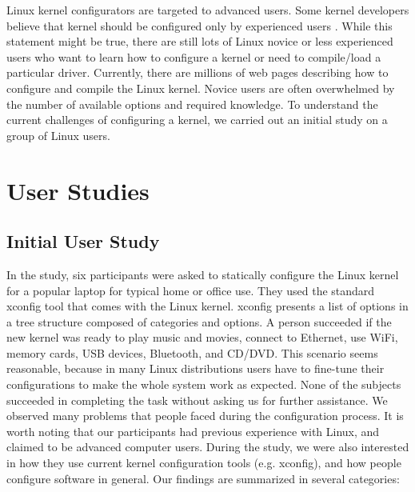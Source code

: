 \documentclass{chi2009}
\begin{document}
Linux kernel configurators are targeted to advanced users. Some kernel developers believe that kernel should be configured only by experienced users
\cite{kernel:aunt:2002}. While this statement might be true, there are still lots of Linux novice or less experienced users who want to learn how to configure a
kernel or need to compile/load a particular driver. Currently, there are millions of web pages describing how to configure and compile the Linux kernel. Novice
users are often overwhelmed by the number of available options and required knowledge. To understand the current challenges of configuring a kernel, we
carried out an initial study on a group of Linux users.

\section{User Studies}\label{sec:userstudies}

\subsection{Initial User Study}
In the study, six participants were asked to statically configure the Linux kernel for a popular laptop for typical home or office use. They used the standard
\textsf{xconfig} tool that comes with the Linux kernel. \textsf{xconfig} presents a list of options in a tree structure composed of categories and options. A
person succeeded if the new kernel was ready to play music and movies, connect to Ethernet, use WiFi, memory cards, USB devices, Bluetooth, and CD/DVD. This
scenario seems reasonable, because in many Linux distributions users have to fine-tune their configurations to make the whole system work as expected. None
of the subjects succeeded in completing the task without asking us for further assistance. We observed many problems that people faced during the configuration
process. It is worth noting that our participants had previous experience with Linux, and claimed to be advanced computer users. During the study, we were also
interested in how they use current kernel configuration tools (e.g. \textsf{xconfig}), and how people configure software in general. Our findings are summarized
in several categories:
\end{document}
